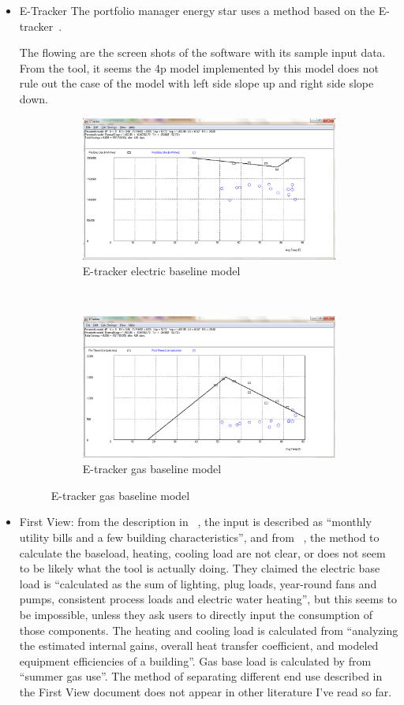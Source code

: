 \documentclass[12pt]{article}
\begin{document}
\begin{itemize}
\item{E-Tracker}
The portfolio manager energy star uses a method based on the
E-tracker~\cite{pmWeather}.

The flowing are the screen shots of the software with its sample input
data. From the tool, it seems the 4p model implemented by this model
does not rule out the case of the model with left side slope up and
right side slope down.
\begin{figure}[h!]
  \centering
  \begin{subfigure}
  \centering
  \includegraphics[width=0.6\linewidth]{images/etracker_model_elec.png}
  \caption{E-tracker electric baseline model}
  \label{fig:elec_etracker}
\end{subfigure}
~
\begin{subfigure}
  \centering
  \includegraphics[width=0.6\linewidth]{images/etracker_model_gas.png}
  \caption{E-tracker gas baseline model}
  \label{fig:heatpower}
\end{subfigure}
\end{figure}
\FloatBarrier
\item First View: from the description in ~\cite{firstView2016}, the
  input is described as ``monthly utility bills and a few building
  characteristics'', and from ~\cite{firstViewUnder2016}, the method
  to calculate the baseload, heating, cooling load are not clear, or
  does not seem to be likely what the tool is actually doing. They
  claimed the electric base load is ``calculated as the sum of
  lighting, plug loads, year-round fans and pumps, consistent process
  loads and electric water heating'', but this seems to be impossible,
  unless they ask users to directly input the consumption of those
  components. The heating and cooling load is calculated from
  ``analyzing the estimated internal gains, overall heat transfer
  coefficient, and modeled equipment efficiencies of a building''. Gas
  base load is calculated by from ``summer gas use''. The method of
  separating different end use described in the First View document
  does not appear in other literature I've read so far. 


\end{itemize}
\end{document}
